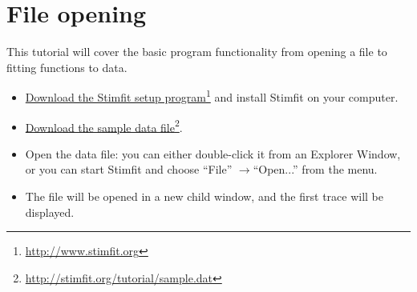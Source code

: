\label{gettingstarted}
\section{File opening}
This tutorial will cover the basic program functionality from opening a file to fitting functions to data.
\begin{itemize}
  \item \href{http://www.stimfit.org/index.php?option=com_content&task=section&id=5&Itemid=27}{Download the Stimfit setup program}\footnote{\url{http://www.stimfit.org}} and install Stimfit on your computer.
  \item \href{http://stimfit.org/tutorial/sample.dat}{Download the sample data file}\footnote{\url{http://stimfit.org/tutorial/sample.dat}}.
  \item Open the data file: you can either double-click it from an Explorer Window, or you can start Stimfit and choose ``File'' $\rightarrow$``Open...'' from the menu.
  \item The file will be opened in a new child window, and the first trace will be displayed.
\end{itemize}

